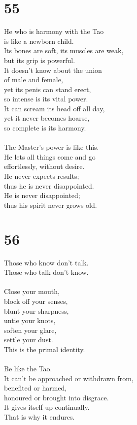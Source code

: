 \documentclass[b5paper, 12pt, oneside]{book}
\begin{document}
\chapter*{55}
He who is harmony with the Tao\\
is like a newborn child.\\
Its bones are soft, its muscles are weak,\\
but its grip is powerful.\\
It doesn't know about the union\\
of male and female,\\
yet its penis can stand erect,\\
so intense is its vital power.\\
It can scream its head off all day,\\
yet it never becomes hoarse,\\
so complete is its harmony.\\
\\
The Master's power is like this.\\
He lets all things come and go\\
effortlessly, without desire.\\
He never expects results;\\
thus he is never disappointed.\\
He is never disappointed;\\
thus his spirit never grows old.\\

\chapter*{56}
Those who know don't talk.\\
Those who talk don't know.\\
\\
Close your mouth,\\
block off your senses,\\
blunt your sharpness,\\
untie your knots,\\
soften your glare,\\
settle your dust.\\
This is the primal identity.\\
\\
Be like the Tao.\\
It can't be approached or withdrawn from,\\
benefited or harmed,\\
honoured or brought into disgrace.\\
It gives itself up continually.\\
That is why it endures.
\end{document}
